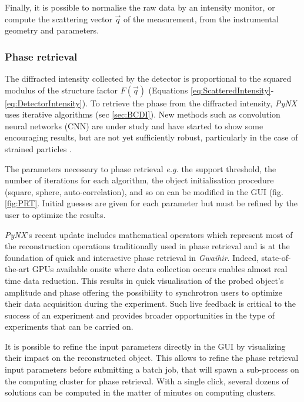 Finally, it is possible to normalise the raw data by an intensity monitor, or compute the scattering vector $\vec{q}$ of the measurement, from the instrumental geometry and parameters.

\subsubsection{Phase retrieval}

The diffracted intensity collected by the detector is proportional to the squared modulus of the structure factor $F(\vec{q})$ (Equations \ref{eq:ScatteredIntensity}-\ref{eq:DetectorIntensity}).
To retrieve the phase from the diffracted intensity, \textit{PyNX} uses iterative algorithms (sec \ref{sec:BCDI}).
New methods such as convolution neural networks (CNN) are under study and have started to show some encouraging results, but are not yet sufficiently robust, particularly in the case of strained particles \cite{cherukara_real-time_2018,chan_rapid_2021,Wu2021}.

The parameters necessary to phase retrieval \parencite{fienup_phase_1982,fienup_reconstruction_1978,Marchesini2007,pynx2020operators} \textit{e.g.} the support threshold, the number of iterations for each algorithm, the object initialisation procedure (square, sphere, auto-correlation), and so on can be modified in the GUI (fig. \ref{fig:PRT}.
Initial guesses are given for each parameter but must be refined by the user to optimize the results.

\textit{PyNX}'s recent update includes mathematical operators \parencite{pynx2020operators} which represent most of the reconstruction operations traditionally used in phase retrieval \parencite{gerchberg_practical_1972,fienup_reconstruction_1978,Marchesini2007} and is at the foundation of quick and interactive phase retrieval in \textit{Gwaihir}.
Indeed, state-of-the-art GPUs available onsite where data collection occurs enables almost real time data reduction.
This results in quick visualisation of the probed object's amplitude and phase offering the possibility to synchrotron users to optimize their data acquisition during the experiment.
Such live feedback is critical to the success of an experiment and provides broader opportunities in the type of experiments that can be carried on.

It is possible to refine the input parameters directly in the GUI by visualizing their impact on the reconstructed object.
This allows to refine the phase retrieval input parameters before submitting a batch job, that will spawn a sub-process on the computing cluster for phase retrieval.
With a single click, several dozens of solutions can be computed in the matter of minutes on computing clusters.

